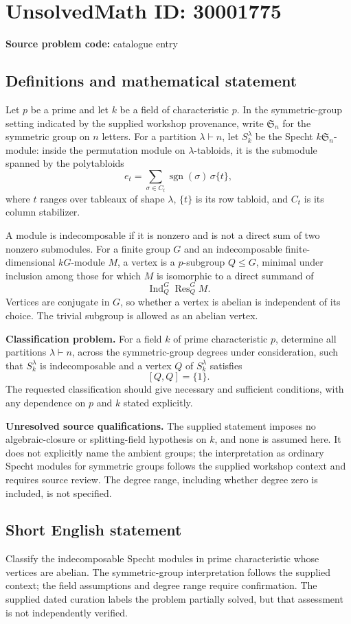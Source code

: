 \documentclass[11pt]{article}
\begin{document}
\section*{UnsolvedMath ID: 30001775}
\textbf{Source problem code:} catalogue entry
\subsection{Definitions and mathematical statement}
Let \(p\) be a prime and let \(k\) be a field of characteristic \(p\). In the symmetric-group setting indicated by the supplied workshop provenance, write \(\mathfrak S_n\) for the symmetric group on \(n\) letters. For a partition \(\lambda\vdash n\), let \(S_k^\lambda\) be the Specht \(k\mathfrak S_n\)-module: inside the permutation module on \(\lambda\)-tabloids, it is the submodule spanned by the polytabloids
\[
e_t=\sum_{\sigma\in C_t}\operatorname{sgn}(\sigma)\,\sigma\{t\},
\]
where \(t\) ranges over tableaux of shape \(\lambda\), \(\{t\}\) is its row tabloid, and \(C_t\) is its column stabilizer.

A module is indecomposable if it is nonzero and is not a direct sum of two nonzero submodules. For a finite group \(G\) and an indecomposable finite-dimensional \(kG\)-module \(M\), a vertex is a \(p\)-subgroup \(Q\leq G\), minimal under inclusion among those for which \(M\) is isomorphic to a direct summand of
\[
\operatorname{Ind}_Q^G\operatorname{Res}_Q^G M.
\]
Vertices are conjugate in \(G\), so whether a vertex is abelian is independent of its choice. The trivial subgroup is allowed as an abelian vertex.

\textbf{Classification problem.} For a field \(k\) of prime characteristic \(p\), determine all partitions \(\lambda\vdash n\), across the symmetric-group degrees under consideration, such that \(S_k^\lambda\) is indecomposable and a vertex \(Q\) of \(S_k^\lambda\) satisfies
\[
[Q,Q]=\{1\}.
\]
The requested classification should give necessary and sufficient conditions, with any dependence on \(p\) and \(k\) stated explicitly.

\textbf{Unresolved source qualifications.} The supplied statement imposes no algebraic-closure or splitting-field hypothesis on \(k\), and none is assumed here. It does not explicitly name the ambient groups; the interpretation as ordinary Specht modules for symmetric groups follows the supplied workshop context and requires source review. The degree range, including whether degree zero is included, is not specified.
\subsection{Short English statement}
Classify the indecomposable Specht modules in prime characteristic whose vertices are abelian. The symmetric-group interpretation follows the supplied context; the field assumptions and degree range require confirmation. The supplied dated curation labels the problem partially solved, but that assessment is not independently verified.
\end{document}
